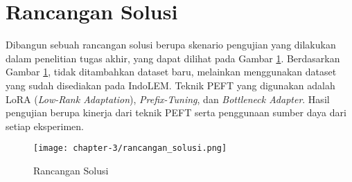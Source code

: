 \section{Rancangan Solusi}

Dibangun sebuah rancangan solusi berupa skenario pengujian yang dilakukan dalam penelitian tugas akhir, yang dapat dilihat pada Gambar \ref{fig:rancangan-solusi}. Berdasarkan Gambar \ref{fig:rancangan-solusi}, tidak ditambahkan dataset baru, melainkan menggunakan dataset yang sudah disediakan pada IndoLEM. Teknik PEFT yang digunakan adalah LoRA (\textit{Low-Rank Adaptation}), \textit{Prefix-Tuning}, dan \textit{Bottleneck Adapter}. Hasil pengujian berupa kinerja dari teknik PEFT serta penggunaan sumber daya dari setiap eksperimen.

\begin{figure}[ht]
    \centering
    \texttt{[image: chapter-3/rancangan\_solusi.png]}
    \caption{Rancangan Solusi}
    \label{fig:rancangan-solusi}
\end{figure}
